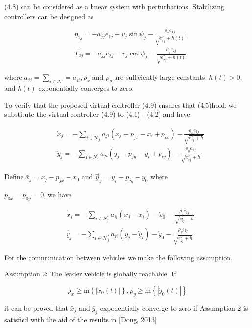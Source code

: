 \documentclass[10pt]{article}
\begin{document}
(4.8) can be considered as a linear system with perturbations. Stabilizing controllers can be designed as

$$
\begin{aligned}
& \eta_{1 j}=-a_{j j} e_{1 j}+v_{j} \sin \psi_{j}-\frac{\rho_{x} e_{1 j}}{\sqrt{e_{1 j}^{2}+h(t)}} \\
& T_{2 j}=-a_{j j} e_{2 j}-v_{j} \cos \psi_{j}-\frac{\rho_{y} e_{2 j}}{\sqrt{e_{2 j}^{2}+h(t)}}
\end{aligned}
$$

where $a_{j j}=\sum_{i \in \mathcal{N}}=a_{j i}, \rho_{x}$ and $\rho_{y}$ are sufficiently large constants, $h(t)>0$, and $h(t)$ exponentially converges to zero.

To verify that the proposed virtual controller (4.9) ensures that (4.5)hold, we substitute the virtual controller (4.9) to (4.1) - (4.2) and have

$$
\begin{aligned}
& \grave{x}_{j}=-\sum_{i \in \mathcal{N}_{j}^{\prime}} a_{j i}\left(x_{j}-p_{j x}-x_{i}+p_{i x}\right)-\frac{\rho_{x} e_{1 j}}{\sqrt{e_{i j}^{2}+h}} \\
& \grave{y}_{j}=-\sum_{i \in N_{j}^{\prime}} a_{j i}\left(y_{j}-p_{j y}-y_{i}+p_{i y}\right)-\frac{\rho_{y} e_{2 j}}{\sqrt{e_{2 j}^{2}+h}}
\end{aligned}
$$

Define $\bar{x}_{j}=x_{j}-p_{j x}-x_{0}$ and $\vec{y}_{j}=y_{j}-p_{j y}-y_{0}$ where

$p_{0 x}=p_{0 y}=0$, we have

$$
\begin{aligned}
& \grave{\grave{x}}_{j}=-\sum_{i \in N_{j}^{*}} a_{j i}\left(\bar{x}_{j}-\bar{x}_{i}\right)-\grave{x}_{0}-\frac{\rho_{x} e_{1 j}}{\sqrt{e_{1 j}^{2}+h}} \\
& \overline{\bar{y}}_{j}=-\sum_{i \in \mathcal{N}_{j}^{*}} a_{j i}\left(\bar{y}_{j}-\grave{y}_{i}\right)-\grave{y}_{0}-\frac{\rho_{y} e_{2 j}}{\sqrt{e_{2 j}^{2}+h}}
\end{aligned}
$$

For the communication between vehicles we make the following assumption.

Assumption 2: The leader vehicle is globally reachable. If

$$
\rho_{x} \geq \mathrm{m}\left\{\left|\grave{x}_{0}(t)\right|\right\}, \rho_{y} \geq \mathrm{m}\left\{\left|\grave{y}_{0}(t)\right|\right\}
$$

it can be proved that $\bar{x}_{j}$ and $\bar{y}_{j}$ exponentially converge to zero if Assumption 2 is satisfied with the aid of the results in [Dong, 2013]
\end{document}
